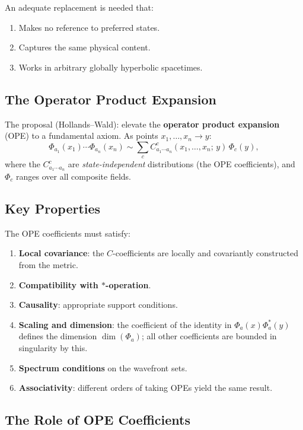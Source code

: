 \documentclass[11pt,a4paper]{article}
\begin{document}
An adequate replacement is needed that:
\begin{enumerate}[nosep]
  \item Makes no reference to preferred states.
  \item Captures the same physical content.
  \item Works in arbitrary globally hyperbolic spacetimes.
\end{enumerate}

\subsection{The Operator Product Expansion}

The proposal (Hollands--Wald): elevate the \textbf{operator product expansion}
(OPE) to a fundamental axiom. As points $x_1,\ldots,x_n \to y$:
\begin{equation}
  \Phi_{a_1}(x_1) \cdots \Phi_{a_n}(x_n) \sim
  \sum_c C^c_{a_1\cdots a_n}(x_1,\ldots,x_n;\, y)\, \Phi_c(y),
\end{equation}
where the $C^c_{a_1\cdots a_n}$ are \emph{state-independent} distributions
(the OPE coefficients), and $\Phi_c$ ranges over all composite fields.

\subsection{Key Properties}

The OPE coefficients must satisfy:
\begin{enumerate}[nosep]
  \item \textbf{Local covariance}: the $C$-coefficients are locally and
        covariantly constructed from the metric.
  \item \textbf{Compatibility with $*$-operation}.
  \item \textbf{Causality}: appropriate support conditions.
  \item \textbf{Scaling and dimension}: the coefficient of the identity
        in $\Phi_a(x)\Phi_a^*(y)$ defines the dimension $\dim(\Phi_a)$;
        all other coefficients are bounded in singularity by this.
  \item \textbf{Spectrum conditions} on the wavefront sets.
  \item \textbf{Associativity}: different orders of taking OPEs yield
        the same result.
\end{enumerate}

\subsection{The Role of OPE Coefficients}
\end{document}
